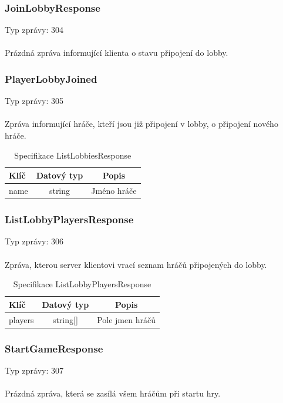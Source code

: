 \documentclass[12pt, a4paper]{article}
\begin{document}
    \subsubsection*{JoinLobbyResponse}
    Typ zprávy: 304\\\\
    Prázdná zpráva informující klienta o stavu připojení do lobby.

    \subsubsection*{PlayerLobbyJoined}
    Typ zprávy: 305\\\\
    Zpráva informující hráče, kteří jsou již připojení v lobby, o připojení nového hráče.

    \begin{table}[H]
        \centering
        \begin{tabular}{|l|c|c|}
            \hline
            Klíč & Datový typ & Popis\\
            \hline
            \hline
            name & string & Jméno hráče\\
            \hline
        \end{tabular}
        \caption{Specifikace ListLobbiesResponse}
    \end{table}

    \subsubsection*{ListLobbyPlayersResponse}
    Typ zprávy: 306\\\\
    Zpráva, kterou server klientovi vrací seznam hráčů připojených do lobby.

    \begin{table}[H]
        \centering
        \begin{tabular}{|l|c|c|}
            \hline
            Klíč & Datový typ & Popis\\
            \hline
            \hline
            players & string[] & Pole jmen hráčů\\
            \hline
        \end{tabular}
        \caption{Specifikace ListLobbyPlayersResponse}
    \end{table}

    \subsubsection*{StartGameResponse}
    Typ zprávy: 307\\\\
    Prázdná zpráva, která se zasílá všem hráčům při startu hry.
\end{document}
